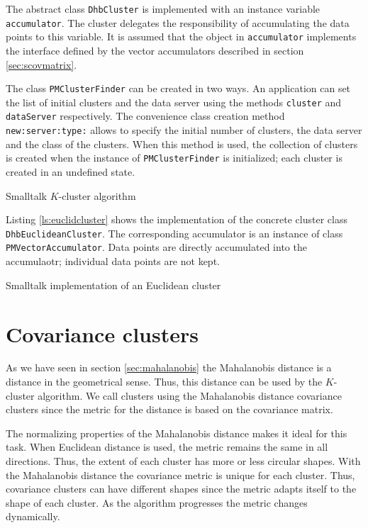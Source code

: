 {The abstract class \texttt{DhbCluster} is implemented with an
instance variable \texttt{accumulator}. The cluster delegates the
responsibility of accumulating the data points to this variable.
It is assumed that the object in \texttt{accumulator} implements the
interface defined by the vector accumulators described in section
\ref{sec:scovmatrix}.

The class \texttt{PMClusterFinder} can be created in two ways. An
application can set the list of initial clusters and the data
server using the methods \texttt{cluster} and \texttt{dataServer}
respectively. The convenience class creation method \texttt{
new:server:type:} allows to specify the initial number of
clusters, the data server and the class of the clusters. When this
method is used, the collection of clusters is created when the
instance of \texttt{PMClusterFinder} is initialized; each cluster is
created in an undefined state.

\begin{listing} Smalltalk $K$-cluster algorithm \label{ls:clusterfinder}


\end{listing}
Listing \ref{ls:euclidcluster} shows the implementation of the
concrete cluster class \texttt{DhbEuclideanCluster}. The
corresponding accumulator is an instance of class \texttt{
PMVectorAccumulator}. Data points are directly accumulated into
the accumulaotr; individual data points are not kept.
\begin{listing} Smalltalk implementation of an Euclidean cluster \label{ls:euclidcluster}

\end{listing}


\section{Covariance clusters}
\label{sec:mahalanobiscluster} As we have seen in section
\ref{sec:mahalanobis} the Mahalanobis distance is a distance in
the geometrical sense. Thus, this distance can be used by the
$K$-cluster algorithm. We call clusters using the Mahalanobis
distance covariance clusters since the metric for the distance is
based on the covariance matrix.

The normalizing properties of the Mahalanobis distance makes it
ideal for this task. When Euclidean distance is used, the metric
remains the same in all directions. Thus, the extent of each
cluster has more or less circular shapes. With the Mahalanobis
distance the covariance metric is unique for each cluster. Thus,
covariance clusters can have different shapes since the metric
adapts itself to the shape of each cluster. As the algorithm
progresses the metric changes dynamically.

}
